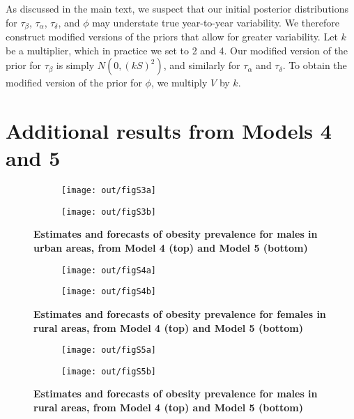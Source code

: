 \documentclass[10pt,letterpaper]{article}
\begin{document}
As discussed in the main text, we suspect that our initial posterior
distributions for \(\tau_{\beta}\), \(\tau_{\alpha}\),
\(\tau_{\delta}\), and \(\phi\) may understate true year-to-year
variability. We therefore construct modified versions of the priors that
allow for greater variability. Let \(k\) be a multiplier, which in
practice we set to 2 and 4. Our modified version of the prior for
\(\tau_{\beta}\) is simply \(N(0, (kS)^2)\), and similarly for
\(\tau_{\alpha}\) and \(\tau_{\delta}\). To obtain the modified version
of the prior for \(\phi\), we multiply \(V\) by \(k\).

\hypertarget{additional-results-from-models-4-and-5}{%
\section{Additional results from Models 4 and
5}\label{additional-results-from-models-4-and-5}}

\begin{figure}[h]
  \centering
  \begin{subfigure}[b]{\textwidth}
        \texttt{[image: out/figS3a]}
  \end{subfigure}
  \begin{subfigure}[b]{\textwidth}
        \texttt{[image: out/figS3b]}
  \end{subfigure}
  \caption{\textbf{Estimates and forecasts of obesity prevalence for males in urban areas, from Model 4 (top) and Model 5 (bottom)}}
\end{figure}

\begin{figure}[h]
  \centering
  \begin{subfigure}[b]{\textwidth}
        \texttt{[image: out/figS4a]}
  \end{subfigure}
  \begin{subfigure}[b]{\textwidth}
        \texttt{[image: out/figS4b]}
  \end{subfigure}
  \caption{\textbf{Estimates and forecasts of obesity prevalence for females in rural areas, from Model 4 (top) and Model 5 (bottom)}}
\end{figure}

\begin{figure}[h]
  \centering
  \begin{subfigure}[b]{\textwidth}
        \texttt{[image: out/figS5a]}
  \end{subfigure}
  \begin{subfigure}[b]{\textwidth}
        \texttt{[image: out/figS5b]}
  \end{subfigure}
  \caption{\textbf{Estimates and forecasts of obesity prevalence for males in rural areas, from Model 4 (top) and Model 5 (bottom)}}
\end{figure}
\end{document}
